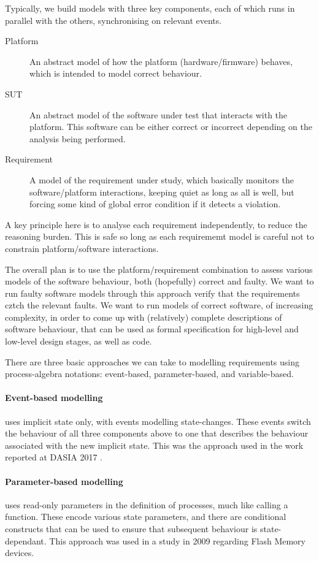 Typically, we build models with three key components,
each of which runs in parallel with the others,
synchronising on relevant events.
\begin{description}
  \item [Platform]
    An abstract model of how the platform (hardware/firmware) behaves,
    which is intended to model correct behaviour.
  \item [SUT]
   An abstract model of the software under test that interacts
   with the platform.
   This software can be either correct or incorrect depending on
   the analysis being performed.
  \item [Requirement]
   A model of the requirement under study, which basically monitors
   the software/platform interactions, keeping quiet as long as all is well,
   but forcing some kind of global error condition if it detects a violation.
\end{description}
A key principle here is to analyse each requirement independently,
to reduce the reasoning burden.
This is safe so long as each requirememt model is careful not
to constrain platform/software interactions.

The overall plan is to use the platform/requirement combination
to assess various models of the software behaviour,
both (hopefully) correct and faulty.
We want to run faulty software models through this approach verify that
the requirements cztch the relevant faults.
We want to run models of correct software, of increasing complexity,
in order to come up with (relatively) complete descriptions
of software behaviour, that can be used as formal specification
for high-level and low-level design stages, as well as code.


There are three basic approaches we can take
to modelling requirements using process-algebra notations:
event-based, parameter-based, and variable-based.

\paragraph{Event-based modelling} uses implicit state only,
with events modelling state-changes.
These events switch the behaviour of all three components above
to one that describes the behaviour associated with the new implicit state.
This was the approach used in the work reported at DASIA 2017 \cite{Lero-DASIA17}.

\paragraph{Parameter-based modelling}
uses read-only parameters in the definition of processes,
much like calling a function.
These encode various state parameters,
and there are conditional constructs that can be used to ensure
that subsequent behaviour is state-dependant.
This approach was used in a study in 2009
regarding Flash Memory devices\cite{DBLP:conf/sbmf/ButterfieldC09}.

